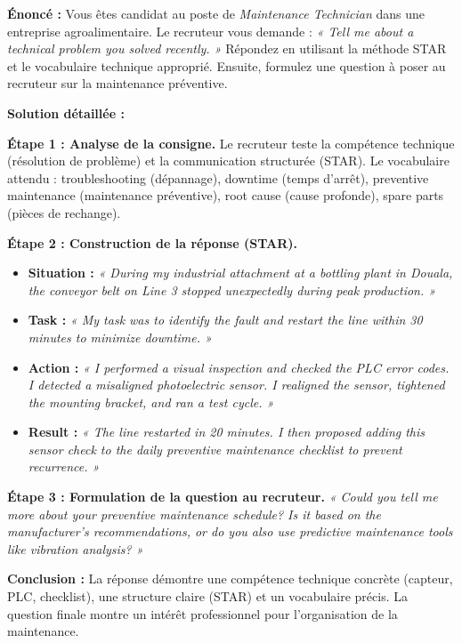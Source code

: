 \documentclass[11pt]{article}
\newcommand{\cle}[1]{{\popxbold\color{popdark}#1}}
\begin{document}
\begin{exoresolu}
\textbf{Énoncé :} Vous êtes candidat au poste de \emph{Maintenance Technician} dans une entreprise agroalimentaire. Le recruteur vous demande : \emph{« Tell me about a technical problem you solved recently. »} Répondez en utilisant la méthode STAR et le vocabulaire technique approprié. Ensuite, formulez une question à poser au recruteur sur la maintenance préventive.

\tcblower
\textbf{Solution détaillée :}

\textbf{Étape 1 : Analyse de la consigne.} Le recruteur teste la compétence technique (résolution de problème) et la communication structurée (STAR). Le vocabulaire attendu : \cle{troubleshooting} (dépannage), \cle{downtime} (temps d'arrêt), \cle{preventive maintenance} (maintenance préventive), \cle{root cause} (cause profonde), \cle{spare parts} (pièces de rechange).

\textbf{Étape 2 : Construction de la réponse (STAR).}
\begin{itemize}
    \item \textbf{Situation :} \emph{« During my industrial attachment at a bottling plant in Douala, the conveyor belt on Line 3 stopped unexpectedly during peak production. »}
    \item \textbf{Task :} \emph{« My task was to identify the fault and restart the line within 30 minutes to minimize \cle{downtime}. »}
    \item \textbf{Action :} \emph{« I performed a \cle{visual inspection} and checked the \cle{PLC} error codes. I detected a \cle{misaligned photoelectric sensor}. I realigned the sensor, tightened the mounting bracket, and ran a \cle{test cycle}. »}
    \item \textbf{Result :} \emph{« The line restarted in 20 minutes. I then proposed adding this sensor check to the \cle{daily preventive maintenance checklist} to prevent recurrence. »}
\end{itemize}

\textbf{Étape 3 : Formulation de la question au recruteur.}
\emph{« Could you tell me more about your \cle{preventive maintenance schedule}? Is it based on the \cle{manufacturer's recommendations}, or do you also use \cle{predictive maintenance} tools like vibration analysis? »}

\textbf{Conclusion :} La réponse démontre une compétence technique concrète (capteur, PLC, checklist), une structure claire (STAR) et un vocabulaire précis. La question finale montre un intérêt professionnel pour l'organisation de la maintenance.
\end{exoresolu}
\end{document}
